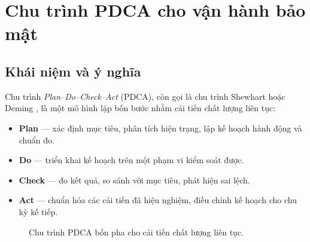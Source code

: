 \section{Chu trình PDCA cho vận hành bảo mật}
\label{sec:pdca}

\subsection{Khái niệm và ý nghĩa}
\label{subsec:pdca-concept}

Chu trình \textit{Plan--Do--Check--Act} (PDCA), còn gọi là chu trình Shewhart hoặc Deming \cite{deming1986pdca}, là một mô hình lặp bốn bước nhằm cải tiến chất lượng liên tục:

\begin{itemize}
  \item \textbf{Plan} --- xác định mục tiêu, phân tích hiện trạng, lập kế hoạch hành động và chuẩn đo.
  \item \textbf{Do} --- triển khai kế hoạch trên một phạm vi kiểm soát được.
  \item \textbf{Check} --- đo kết quả, so sánh với mục tiêu, phát hiện sai lệch.
  \item \textbf{Act} --- chuẩn hóa các cải tiến đã hiệu nghiệm, điều chỉnh kế hoạch cho chu kỳ kế tiếp.
\end{itemize}

\vspace{10pt}
\begin{figure}[!htb]
\centering
{}
\vspace{15pt}
\caption{Chu trình PDCA bốn pha cho cải tiến chất lượng liên tục.}
\label{fig:pdca-cycle}
\end{figure}
\vspace{10pt}

